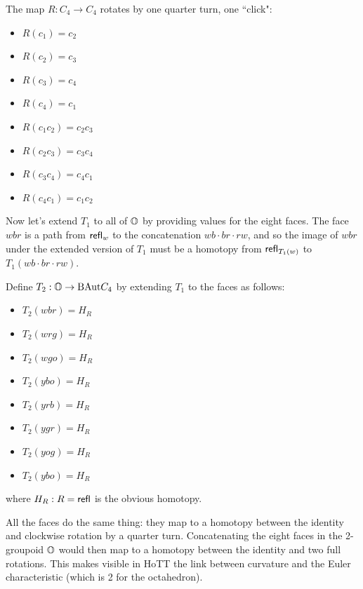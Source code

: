 \begin{mydef}
The map \( R:C_4\to C_4 \) rotates by one quarter turn, one ``click":
\begin{multicols}{2}
\begin{itemize}
\item \( R(c_1) = c_2 \)
\item \( R(c_2) = c_3 \)
\item \( R(c_3) = c_4 \)
\item \( R(c_4) = c_1 \)
\item \( R(c_1c_2) = c_2c_3 \)
\item \( R(c_2c_3) = c_3c_4 \)
\item \( R(c_3c_4) = c_4c_1 \)
\item \( R(c_4c_1) = c_1c_2 \)
\end{itemize}
\end{multicols}
\end{mydef}

Now let's extend \( T_1 \) to all of \( \mathbb{O} \) by providing values for the eight faces. The face \( wbr \) is a path from \( \mathsf{refl}_w \) to the concatenation \( wb\cdot br\cdot rw \), and so the image of \( wbr \) under the extended version of \( T_1 \) must be a homotopy from \( \mathsf{refl}_{T_1(w)} \) to \( T_1(wb\cdot br\cdot rw) \).

\begin{mydef}
Define \( T_2:\mathbb{O}\to\mathrm{BAut} C_4 \) by extending \( T_1 \) to the faces as follows:
\begin{multicols}{2}
\begin{itemize}
\item \( T_2(wbr)=H_R \) 
\item \( T_2(wrg)=H_R \)
\item \( T_2(wgo)=H_R \)
\item \( T_2(ybo)=H_R \)
\item \( T_2(yrb)=H_R \) 
\item \( T_2(ygr)=H_R \)
\item \( T_2(yog)=H_R \)
\item \( T_2(ybo)=H_R \)
\end{itemize}
\end{multicols}
where \( H_R:R=\mathsf{refl} \) is the obvious homotopy.
\end{mydef}

All the faces do the same thing: they map to a homotopy between the identity and clockwise rotation by a quarter turn. Concatenating the eight faces in the 2-groupoid \( \mathbb{O} \) would then map to a homotopy between the identity and two full rotations. This makes visible in HoTT the link between curvature and the Euler characteristic (which is 2 for the octahedron).


